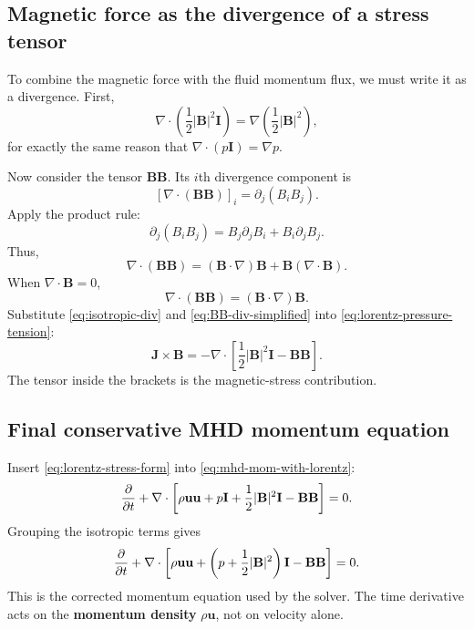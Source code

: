\documentclass[11pt]{article}
\newcommand{\uvec}{\mathbf{u}}
\newcommand{\Bvec}{\mathbf{B}}
\newcommand{\Jvec}{\mathbf{J}}
\newcommand{\Iten}{\mathbf{I}}
\begin{document}
\subsection{Magnetic force as the divergence of a stress tensor}
To combine the magnetic force with the fluid momentum flux, we must write it as a divergence. First,
\begin{equation}
\nabla\cdot\left(\frac12 |\Bvec|^2\Iten\right)=\nabla\left(\frac12 |\Bvec|^2\right),
\label{eq:isotropic-div}
\end{equation}
for exactly the same reason that $\nabla\cdot(p\Iten)=\nabla p$.

Now consider the tensor $\Bvec\Bvec$. Its $i$th divergence component is
\begin{equation}
\left[\nabla\cdot(\Bvec\Bvec)\right]_i = \partial_j(B_iB_j).
\label{eq:BB-div-components}
\end{equation}
Apply the product rule:
\begin{equation}
\partial_j(B_iB_j)=B_j\partial_j B_i + B_i\partial_j B_j.
\label{eq:BB-div-product}
\end{equation}
Thus,
\begin{equation}
\nabla\cdot(\Bvec\Bvec)=(\Bvec\cdot\nabla)\Bvec+\Bvec(\nabla\cdot\Bvec).
\label{eq:BB-div}
\end{equation}
When $\nabla\cdot\Bvec=0$,
\begin{equation}
\nabla\cdot(\Bvec\Bvec)=(\Bvec\cdot\nabla)\Bvec.
\label{eq:BB-div-simplified}
\end{equation}
Substitute \eqref{eq:isotropic-div} and \eqref{eq:BB-div-simplified} into \eqref{eq:lorentz-pressure-tension}:
\begin{equation}
\Jvec\times\Bvec = -\nabla\cdot\left[\frac12 |\Bvec|^2\Iten - \Bvec\Bvec\right].
\label{eq:lorentz-stress-form}
\end{equation}
The tensor inside the brackets is the magnetic-stress contribution.

\subsection{Final conservative MHD momentum equation}
Insert \eqref{eq:lorentz-stress-form} into \eqref{eq:mhd-mom-with-lorentz}:
\begin{equation}
\pdv{}{t}(\rho\uvec)
+ \nabla\cdot\left[\rho\uvec\uvec + p\Iten + \frac12 |\Bvec|^2\Iten - \Bvec\Bvec\right] = 0.
\label{eq:momentum-expanded}
\end{equation}
Grouping the isotropic terms gives
\begin{equation}
\pdv{}{t}(\rho\uvec)
+ \nabla\cdot\left[\rho\uvec\uvec + \left(p+\frac12 |\Bvec|^2\right)\Iten - \Bvec\Bvec\right] = 0.
\label{eq:momentum-tensor}
\end{equation}
This is the corrected momentum equation used by the solver. The time derivative acts on the \textbf{momentum density} $\rho\uvec$, not on velocity alone.
\end{document}
